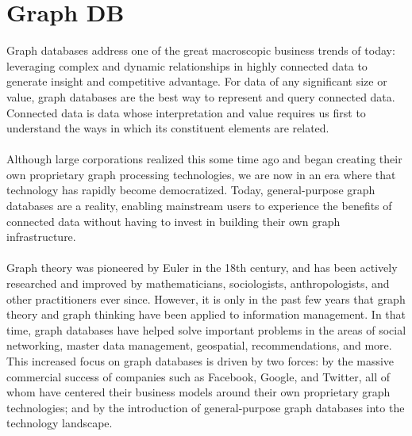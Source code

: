 \documentclass[10pt,a4paper]{article}
\newcommand{\nline}{\\~\\}
\begin{document}
\section{Graph DB}
Graph databases address one of the great macroscopic business trends of today: leveraging complex and dynamic relationships in highly connected data to generate insight and competitive advantage. For data of any significant size or value, graph databases are the best way to represent and query connected data. Connected data is data whose interpretation and value requires us first to understand the ways in which its constituent elements are related. \nline
Although large corporations realized this some time ago and began creating their own proprietary graph processing technologies, we are now in an era where that technology has rapidly become democratized. Today, general-purpose graph databases are a reality, enabling mainstream users to experience the benefits of connected data without having to invest in building their own graph infrastructure.
\nline
Graph theory was pioneered by Euler in the 18th century, and has been actively researched and improved by mathematicians, sociologists, anthropologists, and other practitioners ever since. However, it is only in the past few years that graph theory and graph thinking have been applied to information management. In that time, graph databases have helped solve important problems in the areas of social networking, master data management, geospatial, recommendations, and more. This increased focus on graph databases is driven by two forces: by the massive commercial success of companies such as Facebook, Google, and Twitter, all of whom have centered their business models around their own proprietary graph technologies; and by the introduction of general-purpose graph databases into the technology landscape.
\end{document}
